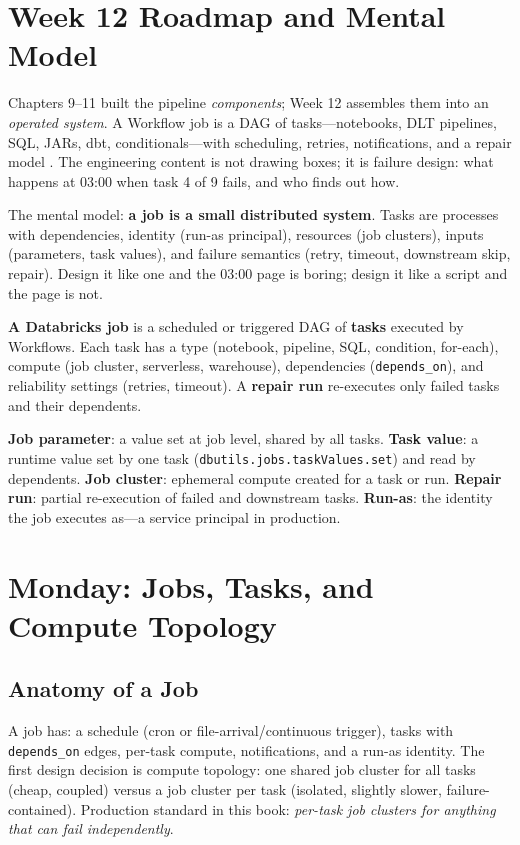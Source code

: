 \section{Week 12 Roadmap and Mental Model}
Chapters 9--11 built the pipeline \emph{components}; Week 12 assembles them into an \emph{operated system}. A Workflow job is a DAG of tasks---notebooks, DLT pipelines, SQL, JARs, dbt, conditionals---with scheduling, retries, notifications, and a repair model \cite{databricksWorkflows}. The engineering content is not drawing boxes; it is failure design: what happens at 03:00 when task 4 of 9 fails, and who finds out how.

The mental model: \textbf{a job is a small distributed system}. Tasks are processes with dependencies, identity (run-as principal), resources (job clusters), inputs (parameters, task values), and failure semantics (retry, timeout, downstream skip, repair). Design it like one and the 03:00 page is boring; design it like a script and the page is not.

\begin{definitionbox}
\textbf{A Databricks job} is a scheduled or triggered DAG of \textbf{tasks} executed by Workflows. Each task has a type (notebook, pipeline, SQL, condition, for-each), compute (job cluster, serverless, warehouse), dependencies (\texttt{depends\_on}), and reliability settings (retries, timeout). A \textbf{repair run} re-executes only failed tasks and their dependents.
\end{definitionbox}

\begin{keyterms}
\textbf{Job parameter}: a value set at job level, shared by all tasks. \textbf{Task value}: a runtime value set by one task (\texttt{dbutils.jobs.taskValues.set}) and read by dependents. \textbf{Job cluster}: ephemeral compute created for a task or run. \textbf{Repair run}: partial re-execution of failed and downstream tasks. \textbf{Run-as}: the identity the job executes as---a service principal in production.
\end{keyterms}

\section{Monday: Jobs, Tasks, and Compute Topology}
\subsection{Anatomy of a Job}
A job has: a schedule (cron or file-arrival/continuous trigger), tasks with \texttt{depends\_on} edges, per-task compute, notifications, and a run-as identity. The first design decision is compute topology: one shared job cluster for all tasks (cheap, coupled) versus a job cluster per task (isolated, slightly slower, failure-contained). Production standard in this book: \emph{per-task job clusters for anything that can fail independently}.

